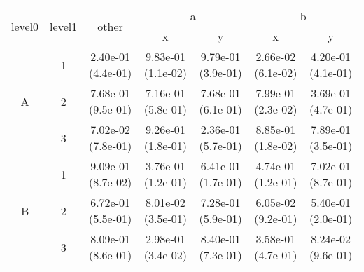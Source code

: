 \begin{tabular}{ccccccc}
\toprule
\multirow{2}{*}{level0} & \multirow{2}{*}{level1}& \multirow{2}{*}{other}&\multicolumn{2}{c}{a}&\multicolumn{2}{c}{b}\tabularnewline
\cmidrule(lr){4-5}
\cmidrule(lr){6-7}
&&&x&y&x&y\tabularnewline
\midrule
\multirow{3}{*}{A}&1& 2.40e-01 (4.4e-01)& 9.83e-01 (1.1e-02)& 9.79e-01 (3.9e-01)& 2.66e-02 (6.1e-02)& 4.20e-01 (4.1e-01)\tabularnewline
&2& 7.68e-01 (9.5e-01)& 7.16e-01 (5.8e-01)& 7.68e-01 (6.1e-01)& 7.99e-01 (2.3e-02)& 3.69e-01 (4.7e-01)\tabularnewline
&3& 7.02e-02 (7.8e-01)& 9.26e-01 (1.8e-01)& 2.36e-01 (5.7e-01)& 8.85e-01 (1.8e-02)& 7.89e-01 (3.5e-01)\tabularnewline
\midrule
\multirow{3}{*}{B}&1& 9.09e-01 (8.7e-02)& 3.76e-01 (1.2e-01)& 6.41e-01 (1.7e-01)& 4.74e-01 (1.2e-01)& 7.02e-01 (8.7e-01)\tabularnewline
&2& 6.72e-01 (5.5e-01)& 8.01e-02 (3.5e-01)& 7.28e-01 (5.9e-01)& 6.05e-02 (9.2e-01)& 5.40e-01 (2.0e-01)\tabularnewline
&3& 8.09e-01 (8.6e-01)& 2.98e-01 (3.4e-02)& 8.40e-01 (7.3e-01)& 3.58e-01 (4.7e-01)& 8.24e-02 (9.6e-01)\tabularnewline
\bottomrule
\end{tabular}
